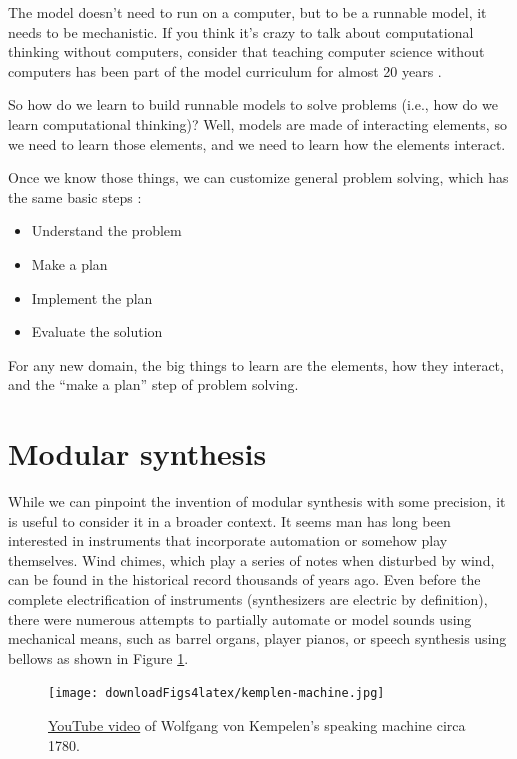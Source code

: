 \documentclass[
]{book}
\providecommand{\tightlist}{%
  \setlength{\itemsep}{0pt}\setlength{\parskip}{0pt}}
\begin{document}
The model doesn't need to run on a computer, but to be a runnable model, it needs to be mechanistic.
If you think it's crazy to talk about computational thinking without computers, consider that teaching computer science without computers has been part of the model curriculum for almost 20 years \citep{Tucker2003, Bell2021}.

So how do we learn to build runnable models to solve problems (i.e., how do we learn computational thinking)?
Well, models are made of interacting elements, so we need to learn those elements, and we need to learn how the elements interact.

Once we know those things, we can customize general problem solving, which has the same basic steps \citep{Polya2004}:

\begin{itemize}
\tightlist
\item
  Understand the problem
\item
  Make a plan
\item
  Implement the plan
\item
  Evaluate the solution
\end{itemize}

For any new domain, the big things to learn are the elements, how they interact, and the ``make a plan'' step of problem solving.

\hypertarget{modular-synthesis}{%
\section{Modular synthesis}\label{modular-synthesis}}

While we can pinpoint the invention of modular synthesis with some precision, it is useful to consider it in a broader context.
It seems man has long been interested in instruments that incorporate automation or somehow play themselves.
Wind chimes, which play a series of notes when disturbed by wind, can be found in the historical record thousands of years ago.
Even before the complete electrification of instruments (synthesizers are electric by definition), there were numerous attempts to partially automate or model sounds using mechanical means, such as barrel organs, player pianos, or speech synthesis using bellows \citep{Dudley1950} as shown in Figure \ref{fig:kemplen-machine}.



\begin{figure}
\centering
\texttt{[image: downloadFigs4latex/kemplen-machine.jpg]}
\caption{\label{fig:kemplen-machine}\href{https://youtu.be/k_YUB_S6Gpo?start=21}{YouTube video} of Wolfgang von Kempelen's speaking machine circa 1780.}
\end{figure}
\end{document}
